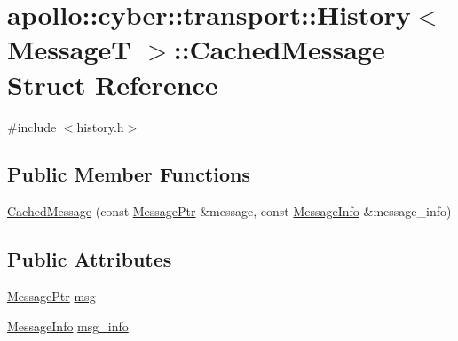 \hypertarget{structapollo_1_1cyber_1_1transport_1_1History_1_1CachedMessage}{\section{apollo\-:\-:cyber\-:\-:transport\-:\-:History$<$ Message\-T $>$\-:\-:Cached\-Message Struct Reference}
\label{structapollo_1_1cyber_1_1transport_1_1History_1_1CachedMessage}
}


{\ttfamily \#include $<$history.\-h$>$}

\subsection*{Public Member Functions}
\begin{DoxyCompactItemize}
\item 
\hyperlink{structapollo_1_1cyber_1_1transport_1_1History_1_1CachedMessage_aa98e44d2f2df28d756f36f631c4737a8}{Cached\-Message} (const \hyperlink{classapollo_1_1cyber_1_1transport_1_1History_a4c11720b1c1d14eafb9fec5436a0d7c0}{Message\-Ptr} \&message, const \hyperlink{classapollo_1_1cyber_1_1transport_1_1MessageInfo}{Message\-Info} \&message\-\_\-info)
\end{DoxyCompactItemize}
\subsection*{Public Attributes}
\begin{DoxyCompactItemize}
\item 
\hyperlink{classapollo_1_1cyber_1_1transport_1_1History_a4c11720b1c1d14eafb9fec5436a0d7c0}{Message\-Ptr} \hyperlink{structapollo_1_1cyber_1_1transport_1_1History_1_1CachedMessage_a48a1ca0f2407b79c69fc63f3ad5fbd46}{msg}
\item 
\hyperlink{classapollo_1_1cyber_1_1transport_1_1MessageInfo}{Message\-Info} \hyperlink{structapollo_1_1cyber_1_1transport_1_1History_1_1CachedMessage_a42ec71985e1d8e8bd86ea77232301278}{msg\-\_\-info}
\end{DoxyCompactItemize}


